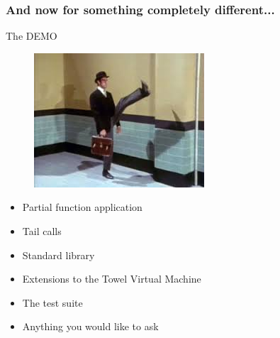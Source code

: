 \documentclass[10pt, compress, handout]{beamer}
\begin{document}
\begin{frame}[fragile]
  \frametitle{And now for something completely different...}

  \huge
  The DEMO

  \begin{figure}[H]
    \includegraphics[scale=0.5]{sillywalk.jpeg}
  \end{figure}
  \normalsize
  \begin{itemize}
  \item Partial function application
  \item Tail calls
  \item Standard library
  \item Extensions to the Towel Virtual Machine
  \item The test suite
  \item Anything you would like to ask
  \end{itemize}
\end{frame}
\end{document}
